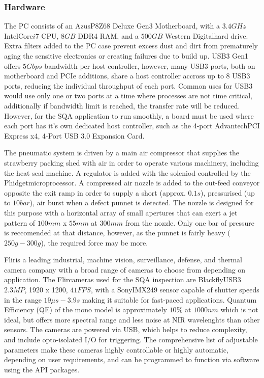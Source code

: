 \documentclass[fleqn,twoside]{article}
\begin{document}
\subsubsection{Hardware}

The PC consists of an Azus\textregistered P8Z68 Deluxe Gen3 Motherboard, with a $3.4GHz$ Intel\textregistered Core\texttrademark $i7$ CPU, $8GB$ DDR4 RAM, and a $500GB$ Western Digital\textregistered hard drive. Extra filters added to the PC case prevent excess dust and dirt from prematurely aging the sensitive electronics or creating failures due to build up. USB3 Gen1 offers $5Gbps$ bandwidth per host controller, however, many USB3 ports, both on motherboard and PCIe additions, share a host controller accross up to 8 USB3 ports, reducing the individual throughput of each port. Common uses for USB3 would use only one or two ports at a time where processes are not time critical, additionally if bandwidth limit is reached, the transfer rate will be reduced. However, for the SQA application to run smoothly, a board must be used where each port has it's own dedicated host controller, such as the 4-port Advantech\texttrademark PCI Express x4, 4-Port USB 3.0 Expansion Card. 

The pneumatic system is driven by a main air compressor that supplies the strawberry packing shed with air in order to operate various machinery, including the heat seal machine. A regulator is added with the soleniod controlled by the Phidget\texttrademark microprocessor. A compressed air nozzle is added to the out-feed conveyor opposite the exit ramp in order to supply a short (approx. $0.1s$), pressurised (up to $10bar$), air burst when a defect punnet is detected. The nozzle is designed for this purpose with a horizontal array of small apertures that can exert a jet pattern of $100mm$ x $55mm$ at $300mm$ from the nozzle. Only one bar of pressure is reccomended at that distance, however, as the punnet is fairly heavy ($250g-300g$), the required force may be more.

Flir\textregistered is a leading industrial, machine vision, surveillance, defense, and thermal camera company with a broad range of cameras to choose from depending on application. The Flir\textregistered cameras used for the SQA inspection are Blackfly\textregistered USB3 $2.3 MP$, 1920 x 1200, $41FPS$, with a Sony\textregistered IMX249 sensor capable of shutter speeds in the range $19\mu s-3.9s$ making it suitable for fast-paced applications. Quantum Efficiency (QE) of the mono model is approximately $10\%$ at $1000nm$ which is not ideal, but offers more spectral range and less noise at NIR wavelenghts than other sensors. The cameras are powered via USB, which helps to reduce complexity, and include opto-isolated I/O for triggering. The comprehensive list of adjustable parameters make these cameras highly controllable or highly automatic, depending on user requirements, and can be programmed to function via software using the API packages. 
\end{document}
